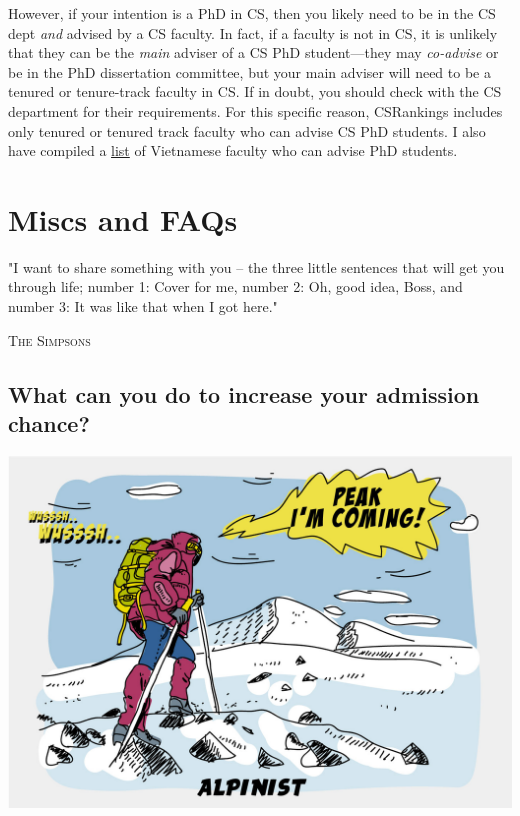 \documentclass[oneside,11pt]{memoir}
\begin{document}
However, if your intention is a PhD in CS, then you likely need to be in the CS dept \emph{and} advised by a CS faculty. In fact, if a faculty is not in CS, it is unlikely that they can be the \emph{main} adviser of a CS PhD student---they may \emph{co-advise} or be in the PhD dissertation committee, but your main adviser will need to be a tenured or tenure-track faculty in CS. If in doubt, you should check with the CS department for their requirements.  For this specific reason,  CSRankings includes only tenured or tenured track faculty who can advise CS PhD students. I also have compiled a \href{https://github.com/dynaroars/dynaroars.github.io/wiki/Viet-CS-Profs-US}{list} of Vietnamese faculty who can advise PhD students. 


\chapter{Miscs and FAQs}
\epigraph{"I want to share something with you – the three little sentences that will get you through life; number 1: Cover for me, number 2: Oh, good idea, Boss, and number 3: It was like that when I got here."}{\textsc{The Simpsons}}

\section{What can you do to increase your admission chance?}\label{sec:improve-your-chance}


\begin{center}
    \includegraphics[scale=0.2]{alpinist-climbing-peak-mountain-comic-hand-drawn-vector-illustration.jpg}
  \end{center}
\end{document}
